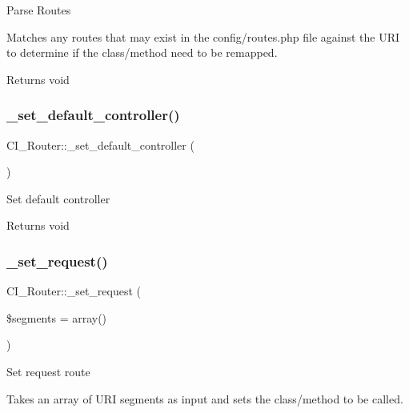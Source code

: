 Parse Routes

Matches any routes that may exist in the config/routes.\+php file against the U\+RI to determine if the class/method need to be remapped.

\begin{DoxyReturn}{Returns}
void 
\end{DoxyReturn}
\mbox{\label{class_c_i___router_a4e4e6149b6e0612f1c5c154139881ba1}} 
\subsubsection{\texorpdfstring{\+\_\+set\+\_\+default\+\_\+controller()}{\_set\_default\_controller()}}
{\footnotesize\ttfamily C\+I\+\_\+\+Router\+::\+\_\+set\+\_\+default\+\_\+controller (\begin{DoxyParamCaption}{ }\end{DoxyParamCaption})\hspace{0.3cm}{\ttfamily [protected]}}

Set default controller

\begin{DoxyReturn}{Returns}
void 
\end{DoxyReturn}
\mbox{\label{class_c_i___router_a686a9ad1e27d85cec9bb4e11285c8906}} 
\subsubsection{\texorpdfstring{\+\_\+set\+\_\+request()}{\_set\_request()}}
{\footnotesize\ttfamily C\+I\+\_\+\+Router\+::\+\_\+set\+\_\+request (\begin{DoxyParamCaption}\item[{}]{\$segments = {\ttfamily array()} }\end{DoxyParamCaption})\hspace{0.3cm}{\ttfamily [protected]}}

Set request route

Takes an array of U\+RI segments as input and sets the class/method to be called.

